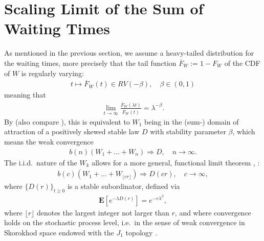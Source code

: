 \documentclass[honours,12pt]{UNSWthesis}
\newcommand{\ex}{\mathbf {E}}
\newcommand{\1}{\mathbf 1}
\numberwithin{equation}{section}
\theoremstyle{definition}
\theoremstyle{remark}
\begin{document}
\section{Scaling Limit of the Sum of Waiting Times}
As mentioned in the previous section, we assume a heavy-tailed distribution 
for the waiting times, more precisely that the tail function 
$\overline F_W := 1 - F_W$ of the CDF of $W$ is regularly varying:
\begin{align}
t \mapsto \overline F_W(t) \in RV(-\beta), \quad \beta \in (0,1)
\end{align}
meaning that \cite{seneta,thebook}
\begin{align*}
\lim_{t \to \infty}\frac{\overline F_W(\lambda t)}{\overline F_W(t)}
= \lambda^{-\beta}.
\end{align*}
By \cite[Cor.~8.2.19]{thebook} (also compare \cite[Th.~4.5.1]{Whitt2010}), this is equivalent to $W_1$ being in the 
(sum-) domain of attraction of a positively skewed stable law $D$ with 
stability parameter $\beta$, which means the weak convergence
\begin{align}
b(n)(W_1 + \ldots + W_n) \Rightarrow D, \quad n \to \infty.
\end{align}
The i.i.d.\ nature of the $W_k$ allows for a more general, functional limit
theorem \cite[Ex.~11.2.18]{thebook}, \cite[Th.~4.5.3]{Whitt2010}:
\begin{align}
b(c)(W_1 + \ldots + W_{\lfloor cr \rfloor}) \Rightarrow D(cr), 
\quad c \to \infty,
\end{align}
where $\{D(r)\}_{t \ge 0}$ is a stable subordinator, defined via 
\begin{align}
\ex[e^{-\lambda D(r)}] = e^{-r \lambda^\beta},
\end{align}
where $\lfloor r \rfloor$ denotes the largest integer not larger than $r$,
and where convergence holds on the stochastic process level, i.e.\ in the sense
of weak convergence in Skorokhod space endowed with the $J_1$ topology
\cite[Sec.~3.3]{Whitt2010}. 
\end{document}
